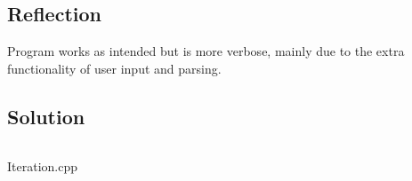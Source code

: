 \documentclass[main.tex]{subfiles}
\begin{document}
        \subsection{Reflection}
            Program works as intended but is more verbose, mainly due to the extra functionality
            of user input and parsing.
        
        \subsection{Solution}
            \begin{listing}[H]
                \inputminted{cpp}{../Tasks/05-Iteration/Iteration.cpp}
                \caption{Iteration.cpp}
            \end{listing}
\end{document}
